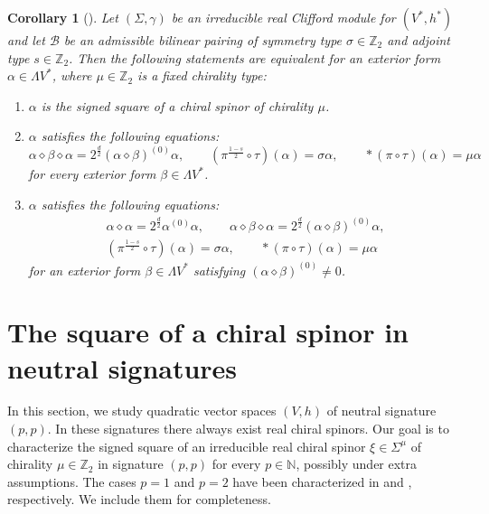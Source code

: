\documentclass[10pt,reqno]{amsart}
\newtheorem{corollary}[theorem]{Corollary}
\theoremstyle{definition}
\theoremstyle{remark}
\newcommand{\N}{\mathbb{N}}
\newcommand{\Z}{\mathbb{Z}}
\begin{document}
\begin{corollary}[{\cite[Cor.\ 3.28]{Cortes_Lazaroiu_Shahbazi2021}}]\label{cor:characterization_chiral_spinorial_forms}
    Let $(\Sigma,\gamma)$ be an irreducible real Clifford module for $(V^*,h^*)$ and let $\mathscr{B}$ be an admissible bilinear pairing of symmetry type $\sigma\in\Z_2$ and adjoint type $s\in\Z_2$. Then the following statements are equivalent for an exterior form $\alpha\in\Lambda V^*$, where $\mu\in\Z_2$ is a fixed chirality type: \begin{enumerate}
        \item $\alpha$ is the signed square of a chiral spinor of chirality $\mu$.
        \item $\alpha$ satisfies the following equations: $$\alpha\diamond\beta\diamond\alpha=2^{\frac{d}{2}}(\alpha\diamond\beta)^{(0)}\alpha,\qquad(\pi^{\frac{1-s}{2}}\circ\tau)(\alpha)=\sigma\alpha,\qquad *(\pi\circ\tau)(\alpha)=\mu\alpha$$ for every exterior form $\beta\in\Lambda V^*$.
        \item $\alpha$ satisfies the following equations: \begin{gather*}
            \alpha\diamond\alpha=2^{\frac{d}{2}}\alpha^{(0)}\alpha,\qquad\alpha\diamond\beta\diamond\alpha=2^{\frac{d}{2}}(\alpha\diamond\beta)^{(0)}\alpha,\\
            (\pi^{\frac{1-s}{2}}\circ\tau)(\alpha)=\sigma\alpha,\qquad *(\pi\circ\tau)(\alpha)=\mu\alpha
        \end{gather*} for an exterior form $\beta\in\Lambda V^*$ satisfying $(\alpha\diamond\beta)^{(0)}\neq0$.
    \end{enumerate}
\end{corollary}


\section{The square of a chiral spinor in neutral signatures}\label{sec:neutral_square}

In this section, we study quadratic vector spaces $(V,h)$ of neutral signature $(p,p)$. In these signatures there always exist real chiral spinors. Our goal is to characterize the signed square of an irreducible real chiral spinor $\xi\in\Sigma^\mu$ of chirality $\mu\in\Z_2$ in signature $(p,p)$ for every $p\in\N$, possibly under extra assumptions. The cases $p=1$ and $p=2$ have been characterized in \cite[Sec.\ 3.6.2]{Cortes_Lazaroiu_Shahbazi2021} and \cite[Sec.\ 3.6.4]{Cortes_Lazaroiu_Shahbazi2021}, respectively. We include them for completeness.
\end{document}
